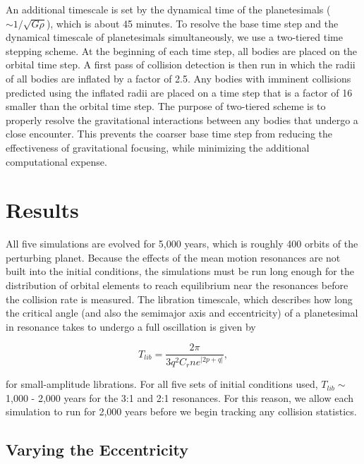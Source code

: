 \documentclass[onecolumn]{aastex63}
\begin{document}
An additional timescale is set by the dynamical time of the planetesimals ($\sim 1/\sqrt{G \rho}$), which is about 45 minutes. To 
resolve the base time step and the dynamical timescale of planetesimals simultaneously, we use a two-tiered time stepping scheme. 
At the beginning of each time step, all bodies are placed on the orbital time step. A first pass of collision detection is then run in 
which the radii of all bodies are inflated by a factor of 2.5. Any bodies with imminent collisions predicted using the inflated radii are 
placed on a time step that is a factor of 16 smaller than the orbital time step. The purpose of two-tiered scheme is to properly resolve 
the gravitational interactions between any bodies that undergo a close encounter. This prevents the coarser base time step from 
reducing the effectiveness of gravitational focusing, while minimizing the additional computational expense.

\section{Results} \label{sec:results}

All five simulations are evolved for 5,000 years, which is roughly 400 orbits of the perturbing planet. Because the effects of the mean motion resonances are not built into the initial conditions, the simulations must be run long enough for the distribution of orbital elements to reach equilibrium near the resonances before the collision rate is measured. The libration timescale, which describes how long the critical angle (and also the semimajor axis and eccentricity) of a planetesimal in resonance takes to undergo a full oscillation is given by

\begin{equation}\label{eq:lib_time}
	T_{lib} = \frac{2 \pi}{3 q^{2} C_{r} n e^{\left| 2p + q \right|}},
\end{equation}

\noindent for small-amplitude librations. For all five sets of initial conditions used, $T_{lib} \sim$ 1,000 - 2,000 years for the 3:1 and 2:1 resonances. For this reason, we allow each simulation to run for 2,000 years before we begin tracking any collision statistics.

\subsection{Varying the Eccentricity}
\end{document}
